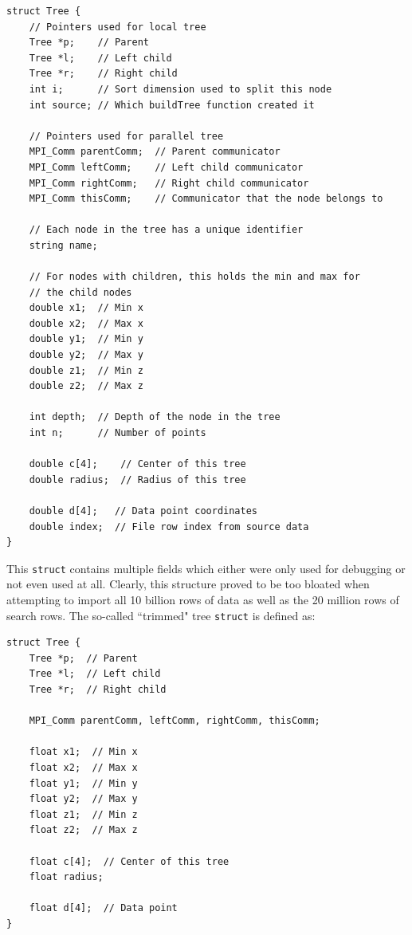 \documentclass{article}
\begin{document}
\begin{minipage}{\linewidth}
\lstset{language=C++, keepspaces=true}
\begin{lstlisting}
struct Tree {
    // Pointers used for local tree
	Tree *p;    // Parent
	Tree *l;    // Left child
	Tree *r;    // Right child
	int i;      // Sort dimension used to split this node
	int source; // Which buildTree function created it

    // Pointers used for parallel tree
	MPI_Comm parentComm;  // Parent communicator
	MPI_Comm leftComm;    // Left child communicator
	MPI_Comm rightComm;   // Right child communicator
	MPI_Comm thisComm;    // Communicator that the node belongs to

    // Each node in the tree has a unique identifier
	string name;

    // For nodes with children, this holds the min and max for
    // the child nodes
	double x1;  // Min x
	double x2;  // Max x
	double y1;  // Min y
	double y2;  // Max y
	double z1;  // Min z
	double z2;  // Max z

	int depth;  // Depth of the node in the tree
	int n;      // Number of points

	double c[4];    // Center of this tree
	double radius;  // Radius of this tree

	double d[4];   // Data point coordinates
	double index;  // File row index from source data
}
\end{lstlisting}
\end{minipage}


This \texttt{struct} contains multiple fields which either were only used for debugging or not even used at all. Clearly, this structure proved to be too bloated when attempting to import all 10 billion rows of data as well as the 20 million rows of search rows. The so-called ``trimmed" tree \texttt{struct} is defined as:

\begin{minipage}{\linewidth}
\lstset{language=C++, keepspaces=true}
\begin{lstlisting}
struct Tree {
	Tree *p;  // Parent
	Tree *l;  // Left child
	Tree *r;  // Right child

	MPI_Comm parentComm, leftComm, rightComm, thisComm;

	float x1;  // Min x
	float x2;  // Max x
	float y1;  // Min y
	float y2;  // Max y
	float z1;  // Min z
	float z2;  // Max z

	float c[4];  // Center of this tree
	float radius;

	float d[4];  // Data point
}
\end{lstlisting}
\end{minipage}
\end{document}
